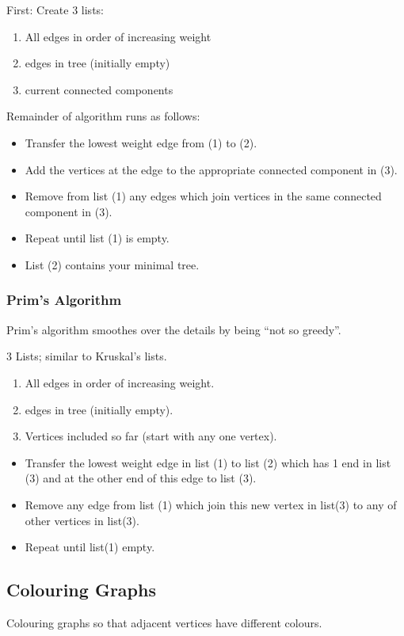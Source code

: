 First: Create 3 lists:
\begin{enumerate}
  \item All edges in order of increasing weight
  \item edges in tree (initially empty)
  \item current connected components
\end{enumerate}

Remainder of algorithm runs as follows:
\begin{itemize}
  \item Transfer the lowest weight edge from (1) to (2).
  \item Add the vertices at the edge to the appropriate connected component in (3).
  \item Remove from list (1) any edges which join vertices in the same connected component in (3).
  \item Repeat until list (1) is empty.
  \item List (2) contains your minimal tree.
\end{itemize}


\subsubsection{Prim's Algorithm}
Prim's algorithm smoothes over the details by being ``not so greedy''.

3 Lists; similar to Kruskal's lists.
\begin{enumerate}
  \item All edges in order of increasing weight.
  \item edges in tree (initially empty).
  \item Vertices included so far (start with any one vertex).
\end{enumerate}

\begin{itemize}
  \item Transfer the lowest weight edge in list (1) to list (2) which has 1 end
  in list (3) and at the other end of this edge to list (3).
  \item Remove any edge from list (1) which join this new vertex in list(3) to any of other vertices in list(3).
  \item Repeat until list(1) empty.
\end{itemize}


\subsection{Colouring Graphs}
\label{sec:ColouringGraphs}
Colouring graphs so that adjacent vertices have different colours.

